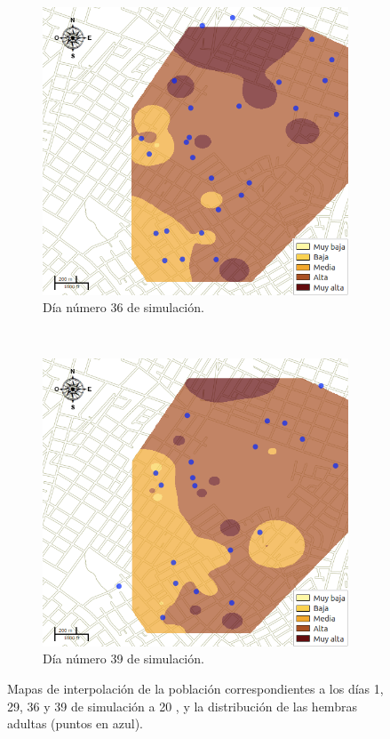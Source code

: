\begin{figure}[!htbp]
    \begin{subfigure}[b]{0.45\textwidth}
            \includegraphics[width=\textwidth]{capitulo-6/graphics/raster/temp-20-35.png}
            \caption{\label{fig:niveles-infestacion-20-c}Día número 36 de simulación.}
    \end{subfigure}
    ~~
    \begin{subfigure}[b]{0.45\textwidth}
            \includegraphics[width=\textwidth]{capitulo-6/graphics/raster/temp-20-38.png}
            \caption{\label{fig:niveles-infestacion-20-d}Día número 39 de simulación.}
    \end{subfigure}

    \caption{\label{fig:niveles-infestacion-20} Mapas de interpolación de la población correspondientes a los días 1, 29, 36 y 39 de simulación a 20 \textcelsius, y la distribución de las hembras adultas (puntos en azul). }
\end{figure}

